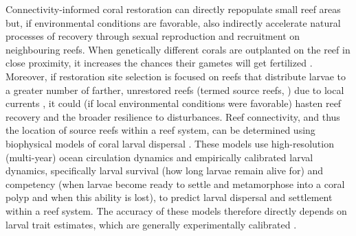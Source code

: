 \documentclass[preprint,12pt,authoryear]{elsarticle}
\begin{document}
	Connectivity-informed coral restoration can directly repopulate small reef areas but, if environmental conditions are favorable, also indirectly accelerate natural processes of recovery through sexual reproduction and recruitment on neighbouring reefs. When genetically different corals are outplanted on the reef in close proximity, it increases the chances their gametes will get fertilized \citep{omori2019coral}. Moreover, if restoration site selection is focused on reefs that distribute larvae to a greater number of farther, unrestored reefs (termed source reefs, \citealp{bode2018resilient}) due to local currents \citep{king2023larval}, it could (if local environmental conditions were favorable) hasten reef recovery and the broader resilience to disturbances. Reef connectivity, and thus the location of source reefs within a reef system, can be determined using biophysical models of coral larval dispersal \citep{frys2020fine,figueiredo2022global,holstein2014consistency,holstein2022predicting,king2023larval}. These models use high-resolution (multi-year) ocean circulation dynamics and empirically calibrated larval dynamics, specifically larval survival (how long larvae remain alive for) and competency (when larvae become ready to settle and metamorphose into a coral polyp and when this ability is lost), to predict larval dispersal and settlement within a reef system. The accuracy of these models therefore directly depends on larval trait estimates, which are generally experimentally calibrated \citep{limer2024life}.
	
\end{document}
